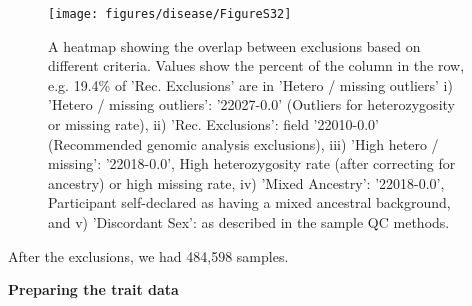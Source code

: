 \documentclass[12pt,twoside]{unicam}
\begin{document}
\begin{figure}

{\centering \texttt{[image: figures/disease/FigureS32]} 

}

\caption[A heatmap showing the overlap between sample exclusions based on different criteria.]{A heatmap showing the overlap between exclusions based on different criteria. Values show the percent of the column in the row, e.g. 19.4\% of 'Rec. Exclusions' are in 'Hetero / missing outliers' i) 'Hetero / missing outliers': '22027-0.0' (Outliers for heterozygosity or missing rate), ii) 'Rec. Exclusions': field '22010-0.0' (Recommended genomic analysis exclusions), iii) 'High hetero / missing': '22018-0.0', High heterozygosity rate (after correcting for ancestry) or high missing rate, iv) 'Mixed Ancestry': '22018-0.0', Participant self-declared as having a mixed ancestral background, and v) 'Discordant Sex': as described in the sample QC methods.}\label{fig:disFigS32}
\end{figure}

After the exclusions, we had 484,598 samples.

\textbf{Preparing the trait data}
\end{document}

